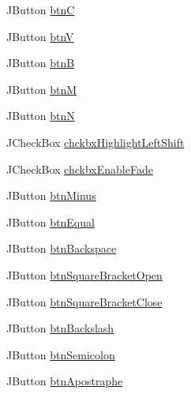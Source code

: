 \begin{DoxyCompactItemize}
\item 
J\+Button \hyperlink{classcom_1_1lclion_1_1midigui_1_1_dialog_on_screen_keyboard_a108c048ae6e4a0db145ee98ea9df481f}{btn\+C}
\item 
J\+Button \hyperlink{classcom_1_1lclion_1_1midigui_1_1_dialog_on_screen_keyboard_aadd7043de06b30089cb9b8ca0943a5ea}{btn\+V}
\item 
J\+Button \hyperlink{classcom_1_1lclion_1_1midigui_1_1_dialog_on_screen_keyboard_a34a37d547948df48303ba0103cde59de}{btn\+B}
\item 
J\+Button \hyperlink{classcom_1_1lclion_1_1midigui_1_1_dialog_on_screen_keyboard_af47ad194bb3c4931c47c17f5d9ec98c4}{btn\+M}
\item 
J\+Button \hyperlink{classcom_1_1lclion_1_1midigui_1_1_dialog_on_screen_keyboard_a99f24b18e5f535f5666b073fe414fdfa}{btn\+N}
\item 
J\+Check\+Box \hyperlink{classcom_1_1lclion_1_1midigui_1_1_dialog_on_screen_keyboard_a9aaed51dba7caa44dc53b28e7acc096d}{chckbx\+Highlight\+Left\+Shift}
\item 
J\+Check\+Box \hyperlink{classcom_1_1lclion_1_1midigui_1_1_dialog_on_screen_keyboard_a8dd6d82143f4aedba6236c67bf6c733f}{chckbx\+Enable\+Fade}
\item 
J\+Button \hyperlink{classcom_1_1lclion_1_1midigui_1_1_dialog_on_screen_keyboard_a5d7ba779d4e74df2616b1a5fb6fdbdfd}{btn\+Minus}
\item 
J\+Button \hyperlink{classcom_1_1lclion_1_1midigui_1_1_dialog_on_screen_keyboard_aeccc007709a2413953c476a47633484d}{btn\+Equal}
\item 
J\+Button \hyperlink{classcom_1_1lclion_1_1midigui_1_1_dialog_on_screen_keyboard_af531e3a095c123589a66fc5aa9373067}{btn\+Backspace}
\item 
J\+Button \hyperlink{classcom_1_1lclion_1_1midigui_1_1_dialog_on_screen_keyboard_ad6c00cf5c5a45173be827dafa072041b}{btn\+Square\+Bracket\+Open}
\item 
J\+Button \hyperlink{classcom_1_1lclion_1_1midigui_1_1_dialog_on_screen_keyboard_a35b8fdc6e8d3dd6062dc18572df13e7d}{btn\+Square\+Bracket\+Close}
\item 
J\+Button \hyperlink{classcom_1_1lclion_1_1midigui_1_1_dialog_on_screen_keyboard_afcc98561cbf032feebf7b1538b1ba688}{btn\+Backslash}
\item 
J\+Button \hyperlink{classcom_1_1lclion_1_1midigui_1_1_dialog_on_screen_keyboard_afbc77b1edd4a0583a8e7699a9f15ded7}{btn\+Semicolon}
\item 
J\+Button \hyperlink{classcom_1_1lclion_1_1midigui_1_1_dialog_on_screen_keyboard_af8bd4bb6dd42d1f0c8b9432a7b3dd5e5}{btn\+Apostraphe}

\end{DoxyCompactItemize}
